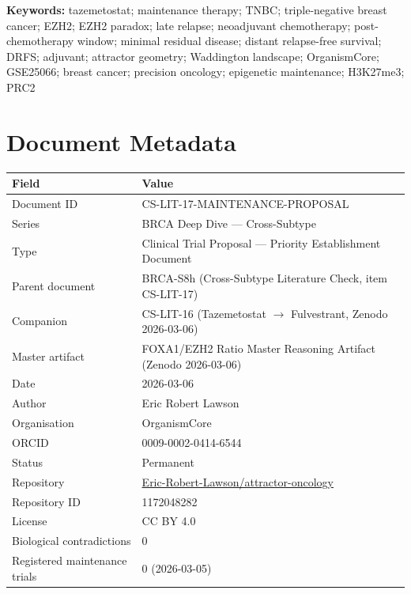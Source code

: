 \documentclass[12pt, a4paper]{article}
\begin{document}
\vspace{0.5em}
\noindent\textbf{Keywords:}
tazemetostat; maintenance therapy; TNBC;
triple-negative breast cancer; EZH2; EZH2 paradox;
late relapse; neoadjuvant chemotherapy;
post-chemotherapy window; minimal residual disease;
distant relapse-free survival; DRFS; adjuvant;
attractor geometry; Waddington landscape; OrganismCore;
GSE25066; breast cancer; precision oncology;
epigenetic maintenance; H3K27me3; PRC2

\newpage
\tableofcontents
\newpage

\section{Document Metadata}

\begin{center}
\begin{tabular}{ll}
\toprule
\textbf{Field} & \textbf{Value} \\
\midrule
Document ID       & CS-LIT-17-MAINTENANCE-PROPOSAL \\
Series            & BRCA Deep Dive --- Cross-Subtype \\
Type              & Clinical Trial Proposal ---
                    Priority Establishment Document \\
Parent document   & BRCA-S8h (Cross-Subtype Literature
                    Check, item CS-LIT-17) \\
Companion         & CS-LIT-16 (Tazemetostat $\rightarrow$
                    Fulvestrant, Zenodo 2026-03-06) \\
Master artifact   & FOXA1/EZH2 Ratio Master Reasoning
                    Artifact (Zenodo 2026-03-06) \\
Date              & 2026-03-06 \\
Author            & Eric Robert Lawson \\
Organisation      & OrganismCore \\
ORCID             & 0009-0002-0414-6544 \\
Status            & Permanent \\
Repository        &
  \href{https://github.com/Eric-Robert-Lawson/attractor-oncology}
       {Eric-Robert-Lawson/attractor-oncology} \\
Repository ID     & 1172048282 \\
License           & CC BY 4.0 \\
Biological contradictions & 0 \\
Registered maintenance trials & 0 (2026-03-05) \\
\bottomrule
\end{tabular}
\end{center}
\end{document}
